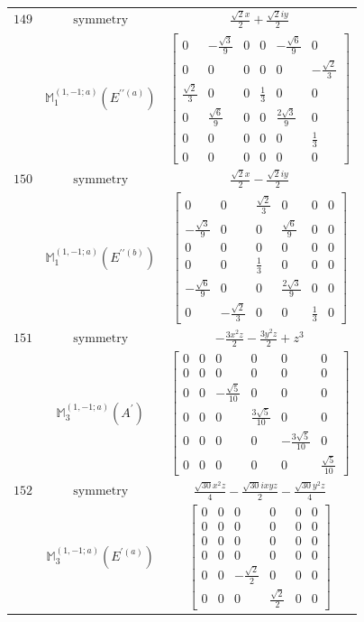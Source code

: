 \documentclass[fleqn,8pt,landscape]{jsarticle}
\begin{document}
\begin{longtable}{ccc}
$ 149 $ & $ \text{symmetry} $ & $ \frac{\sqrt{2} x}{2} + \frac{\sqrt{2} i y}{2} $ \\
$  $ & $ \mathbb{M}_{1}^{(1,-1;a)}(E^{\prime\prime(a)}) $ & $ \begin{bmatrix} 0 & - \frac{\sqrt{3}}{9} & 0 & 0 & - \frac{\sqrt{6}}{9} & 0 \\ 0 & 0 & 0 & 0 & 0 & - \frac{\sqrt{2}}{3} \\ \frac{\sqrt{2}}{3} & 0 & 0 & \frac{1}{3} & 0 & 0 \\ 0 & \frac{\sqrt{6}}{9} & 0 & 0 & \frac{2 \sqrt{3}}{9} & 0 \\ 0 & 0 & 0 & 0 & 0 & \frac{1}{3} \\ 0 & 0 & 0 & 0 & 0 & 0 \end{bmatrix} $ \\ \hline
$ 150 $ & $ \text{symmetry} $ & $ \frac{\sqrt{2} x}{2} - \frac{\sqrt{2} i y}{2} $ \\
$  $ & $ \mathbb{M}_{1}^{(1,-1;a)}(E^{\prime\prime(b)}) $ & $ \begin{bmatrix} 0 & 0 & \frac{\sqrt{2}}{3} & 0 & 0 & 0 \\ - \frac{\sqrt{3}}{9} & 0 & 0 & \frac{\sqrt{6}}{9} & 0 & 0 \\ 0 & 0 & 0 & 0 & 0 & 0 \\ 0 & 0 & \frac{1}{3} & 0 & 0 & 0 \\ - \frac{\sqrt{6}}{9} & 0 & 0 & \frac{2 \sqrt{3}}{9} & 0 & 0 \\ 0 & - \frac{\sqrt{2}}{3} & 0 & 0 & \frac{1}{3} & 0 \end{bmatrix} $ \\ \hline
$ 151 $ & $ \text{symmetry} $ & $ - \frac{3 x^{2} z}{2} - \frac{3 y^{2} z}{2} + z^{3} $ \\
$  $ & $ \mathbb{M}_{3}^{(1,-1;a)}(A^{\prime}) $ & $ \begin{bmatrix} 0 & 0 & 0 & 0 & 0 & 0 \\ 0 & 0 & 0 & 0 & 0 & 0 \\ 0 & 0 & - \frac{\sqrt{5}}{10} & 0 & 0 & 0 \\ 0 & 0 & 0 & \frac{3 \sqrt{5}}{10} & 0 & 0 \\ 0 & 0 & 0 & 0 & - \frac{3 \sqrt{5}}{10} & 0 \\ 0 & 0 & 0 & 0 & 0 & \frac{\sqrt{5}}{10} \end{bmatrix} $ \\ \hline
$ 152 $ & $ \text{symmetry} $ & $ \frac{\sqrt{30} x^{2} z}{4} - \frac{\sqrt{30} i x y z}{2} - \frac{\sqrt{30} y^{2} z}{4} $ \\
$  $ & $ \mathbb{M}_{3}^{(1,-1;a)}(E^{\prime(a)}) $ & $ \begin{bmatrix} 0 & 0 & 0 & 0 & 0 & 0 \\ 0 & 0 & 0 & 0 & 0 & 0 \\ 0 & 0 & 0 & 0 & 0 & 0 \\ 0 & 0 & 0 & 0 & 0 & 0 \\ 0 & 0 & - \frac{\sqrt{2}}{2} & 0 & 0 & 0 \\ 0 & 0 & 0 & \frac{\sqrt{2}}{2} & 0 & 0 \end{bmatrix} $ \\ \hline

\end{longtable}
\end{document}

